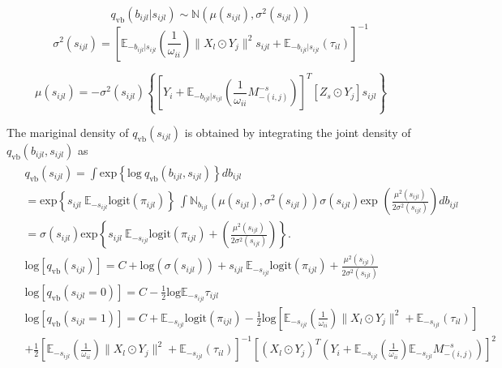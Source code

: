 \documentclass[
]{book}
\begin{document}
\[q_{\text{vb}}(b_{ijl}|s_{ijl}) \sim \mathbb{N} \left(\mu(s_{ijl}),\sigma^2(s_{ijl})\right)\]
\[\sigma^2(s_{ijl}) = \left[
\mathbb{E}_{-b_{ijl}|s_{ijl}}(\frac{1}{\omega_{ii}})\|X_l \odot Y_j\|^2 s_{ijl} + \mathbb{E}_{-b_{ijl}|s_{ijl}}(\tau_{il}) \right]^{-1}\]

\[\mu(s_{ijl}) = - \sigma^2(s_{ijl})
\left\{
\left[Y_i + \mathbb{E}_{-b_{ijl}|s_{ijl}}
\left(\frac{1}{\omega_{ii}} M_{-(i,j)}^{-s}
\right)
\right]^T
[Z_s \odot Y_j]  s_{ijl}
\right\}\]

The mariginal density of \(q_{\text{vb}}(s_{ijl})\) is obtained by integrating the joint density of \(q_{\text{vb}}(b_{ijl},s_{ijl})\) as
\begin{align*}
\begin{split}
& q_{\text{vb}}(s_{ijl}) = \int \text{exp} \left\{ \text{log} \ q_{\text{vb}}(b_{ijl},s_{ijl}) \right\}db_{ijl} \\
& = \text{exp} \left\{
    s_{ijl} \ \mathbb{E}_{-s_{ijl}} \text{logit}(\pi_{ijl})\right\}\ \int \mathbb{N}_{b_{ijl}}
    \left(\mu(s_{ijl}),\sigma^2(s_{ijl})\right) \sigma(s_{ijl}) 
    \text{exp } \left(
    \frac{\mu^2(s_{ijl})}{2\sigma^2(s_{ijl})}\right) db_{ijl} \\
& = \sigma(s_{ijl})
    \text{exp} \left\{
    s_{ijl} \ \mathbb{E}_{-s_{ijl}} \text{logit}(\pi_{ijl}) + \left(
    \frac{\mu^2(s_{ijl})}{2\sigma^2(s_{ijl})}\right)
    \right\}. \\
& \text{log} [q_{\text{vb}}(s_{ijl})] =
    C + \text{log}(\sigma(s_{ijl})) +
    s_{ijl} \ \mathbb{E}_{-s_{ijl}} \text{logit}(\pi_{ijl}) + 
    \frac{\mu^2(s_{ijl})}{2\sigma^2(s_{ijl})}  \\    
& \text{log} [q_{\text{vb}}(s_{ijl}=0)] = C - \frac{1}{2} \text{log} \mathbb{E}_{-s_{ijl}}\tau_{ijl} \\
& \text{log} [q_{\text{vb}}(s_{ijl}=1)] = C +\mathbb{E}_{-s_{ijl}} \text{logit}(\pi_{ijl})
- \frac{1}{2} \text{log} \left[\mathbb{E}_{-s_{ijl}}(\frac{1}{\omega_{ii}})\|X_l \odot Y_j\|^2 + \mathbb{E}_{-s_{ijl}}(\tau_{il}) \right] \\
& + \frac{1}{2}\left[\mathbb{E}_{-s_{ijl}}(\frac{1}{\omega_{ii}})\|X_l \odot Y_j\|^2 + \mathbb{E}_{-s_{ijl}}(\tau_{il}) \right]^{-1}\left[(X_l \odot Y_j)^T (Y_i + \mathbb{E}_{-s_{ijl}} \left(\frac{1}{\omega_{ii}}\right) \mathbb{E}_{-s_{ijl}} M_{-(i,j)}^{-s}) \right]^2
\end{split}
\end{align*}
\end{document}
